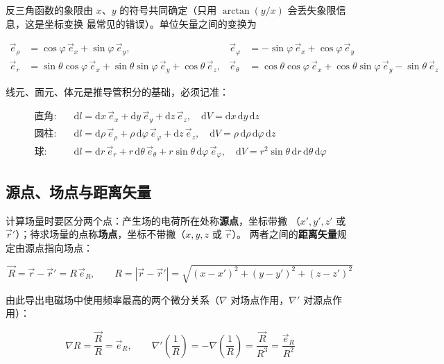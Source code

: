 反三角函数的象限由 $x$、$y$ 的符号共同确定（只用 $\arctan(y/x)$ 会丢失象限信息，这是坐标变换
最常见的错误）。单位矢量之间的变换为
\begin{formulaBox}
\[
\begin{aligned}
\vec{e}_\rho&=\cos\varphi\,\vec{e}_x+\sin\varphi\,\vec{e}_y, &
\vec{e}_\varphi&=-\sin\varphi\,\vec{e}_x+\cos\varphi\,\vec{e}_y\\[2pt]
\vec{e}_r&=\sin\theta\cos\varphi\,\vec{e}_x+\sin\theta\sin\varphi\,\vec{e}_y+\cos\theta\,\vec{e}_z, &
\vec{e}_\theta&=\cos\theta\cos\varphi\,\vec{e}_x+\cos\theta\sin\varphi\,\vec{e}_y-\sin\theta\,\vec{e}_z
\end{aligned}
\]
\end{formulaBox}

线元、面元、体元是推导管积分的基础，必须记准：
\begin{formulaBox}
\[
\begin{aligned}
\text{直角}:\quad &\mathrm{d}l=\mathrm{d}x\,\vec{e}_x+\mathrm{d}y\,\vec{e}_y+\mathrm{d}z\,\vec{e}_z,\quad \mathrm{d}V=\mathrm{d}x\,\mathrm{d}y\,\mathrm{d}z\\
\text{圆柱}:\quad &\mathrm{d}l=\mathrm{d}\rho\,\vec{e}_\rho+\rho\,\mathrm{d}\varphi\,\vec{e}_\varphi+\mathrm{d}z\,\vec{e}_z,\quad \mathrm{d}V=\rho\,\mathrm{d}\rho\,\mathrm{d}\varphi\,\mathrm{d}z\\
\text{球}:\quad &\mathrm{d}l=\mathrm{d}r\,\vec{e}_r+r\,\mathrm{d}\theta\,\vec{e}_\theta+r\sin\theta\,\mathrm{d}\varphi\,\vec{e}_\varphi,\quad \mathrm{d}V=r^2\sin\theta\,\mathrm{d}r\,\mathrm{d}\theta\,\mathrm{d}\varphi
\end{aligned}
\]
\end{formulaBox}

\subsection{源点、场点与距离矢量}

计算场量时要区分两个点：产生场的电荷所在处称\textbf{源点}，坐标带撇
（$x',y',z'$ 或 $\vec{r}'$）；待求场量的点称\textbf{场点}，坐标不带撇（$x,y,z$ 或 $\vec{r}$）。
两者之间的\textbf{距离矢量}规定由源点指向场点：
\begin{formulaBox}
\[
\vec{R}=\vec{r}-\vec{r}'=R\,\vec{e}_R,\qquad R=|\vec{r}-\vec{r}'|=\sqrt{(x-x')^2+(y-y')^2+(z-z')^2}
\]
\end{formulaBox}

由此导出电磁场中使用频率最高的两个微分关系（$\nabla$ 对场点作用，$\nabla'$ 对源点作用）：
\begin{formulaBox}
\[
\nabla R=\frac{\vec{R}}{R}=\vec{e}_R,\qquad
\nabla'\left(\frac{1}{R}\right)=-\nabla\left(\frac{1}{R}\right)=\frac{\vec{R}}{R^3}=\frac{\vec{e}_R}{R^2}
\]
\end{formulaBox}

